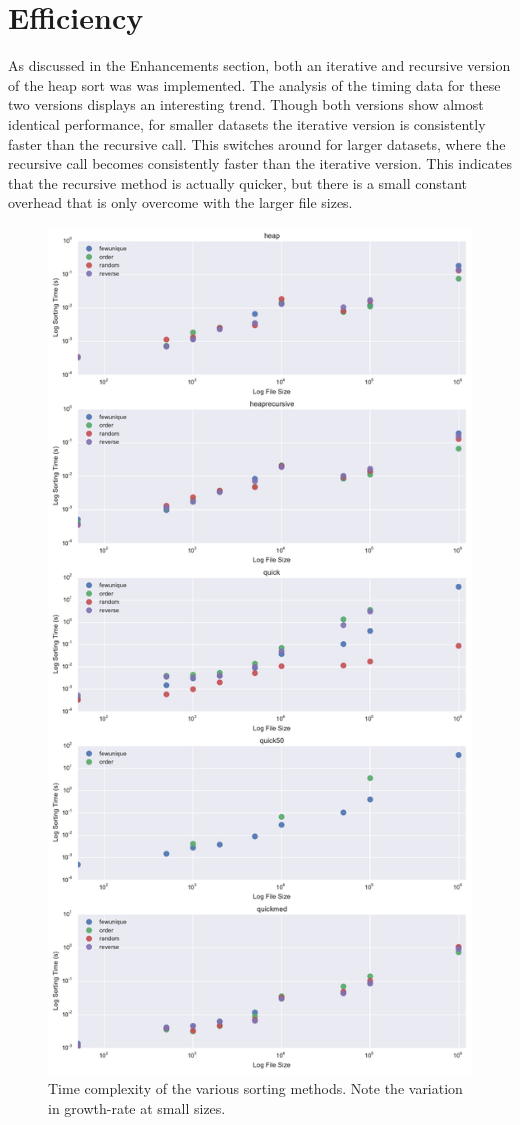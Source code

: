 \documentclass[a4paper,12pt]{article}
\begin{document}

\section{Efficiency}


As discussed in the Enhancements section, both an iterative and recursive version of the heap sort was was implemented.  The analysis of the timing data for these two versions displays an interesting trend.  Though both versions show almost identical performance, for smaller datasets the iterative version is consistently faster than the recursive call.  This switches around for larger datasets, where the recursive call becomes consistently faster than the iterative version.  This indicates that the recursive method is actually quicker, but there is a small constant overhead that is only overcome with the larger file sizes.


\begin{figure}[h]
    \centering
    \includegraphics[width=.8\textwidth]{sorting_efficiency.pdf}
    \caption{Time complexity of the various sorting methods.  Note the variation in growth-rate at small sizes.}
    \label{fig:mesh1}
\end{figure}
\end{document}
